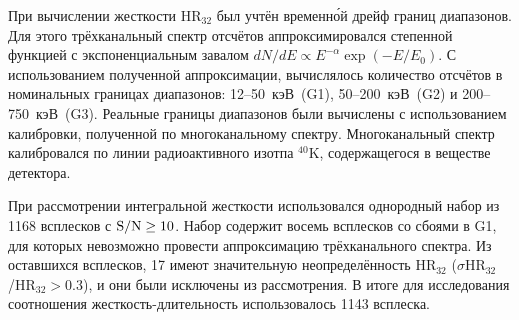 При вычислении жесткости HR$_{32}$ был учтён временн\'{о}й дрейф границ диапазонов. 
Для этого трёхканальный спектр отсчётов аппроксимировался степенной функцией 
с экспоненциальным завалом $dN/dE \propto E^{-\alpha} \exp(-E/E_0)$. 
С использованием полученной аппроксимации, вычислялось количество отсчётов в номинальных 
границах диапазонов: 12--50~кэВ~(G1), 50--200~кэВ~(G2) и 200--750~кэВ~(G3). 
Реальные границы диапазонов были вычислены с использованием калибровки, полученной 
по многоканальному спектру.  Многоканальный спектр калибровался по линии 
радиоактивного изотпа $^{40}$K, содержащегося в веществе детектора.

При рассмотрении интегральной жесткости использовался однородный набор из 1168 
всплесков с ${\mathrm{S/N}} \geq 10$. Набор содержит восемь всплесков со сбоями в G1, 
для которых невозможно провести аппроксимацию трёхканального спектра. 
Из оставшихся всплесков, 17 имеют значительную неопределённость HR$_{32}$ 
($\sigma$HR$_{32}$/HR$_{32} >0.3$), и они были исключены из рассмотрения. 
В итоге для исследования соотношения жесткость-длительность использовалось 1143 всплеска.

